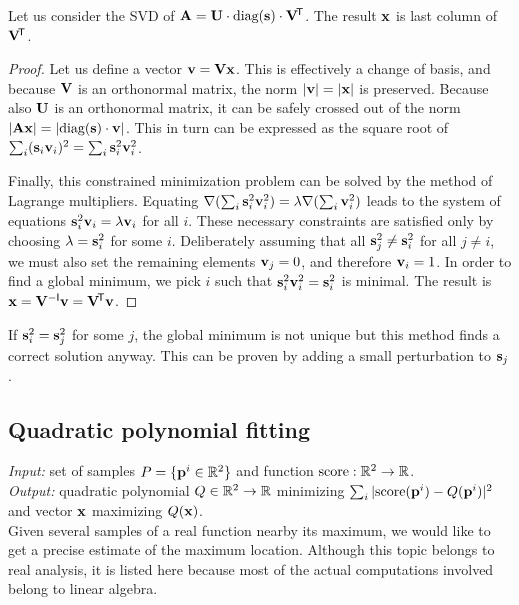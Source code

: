 Let us consider the SVD of $\mathbf{A} = \mathbf{U} \cdot \textrm{diag}(\mathbf{s}) \cdot \mathbf{V}^{\!\mathsf{T}}$.
The result $\mathbf{x}$ is last column of $\mathbf{V} ^{\!\mathsf{T}}$.

\begin{proof}
Let us define a vector $\mathbf{v} = \mathbf{V} \mathbf{x}$.
This is effectively a change of basis, and because $\mathbf{V}$ is an orthonormal matrix, the norm $|\mathbf{v}| = |\mathbf{x}|$ is preserved.
Because also $\mathbf{U}$ is an orthonormal matrix, it can be safely crossed out of the norm $|\mathbf{A} \mathbf{x}| = |\textrm{diag}(\mathbf{s}) \cdot \mathbf{v}|$.
This in turn can be expressed as the square root of $\sum_i (\mathbf{s}_i \mathbf{v}_i)^2 = \sum_i \mathbf{s}_i^2 \mathbf{v}_i^2$.

Finally, this constrained minimization problem can be solved by the method of Lagrange multipliers.
Equating $\nabla(\sum_i \mathbf{s}_i^2 \mathbf{v}_i^2) = \lambda \nabla (\sum_i \mathbf{v}_i^2)$ leads to the system of equations $\mathbf{s}_i^2 \mathbf{v}_i = \lambda \mathbf{v}_i$ for all $i$.
These necessary constraints are satisfied only by choosing $\lambda = \mathbf{s}_i^2$ for some $i$.
Deliberately assuming that all $\mathbf{s}_j^2 \neq \mathbf{s}_i^2$ for all $j \neq i$, we must also set the remaining elements $\mathbf{v}_j = 0$, and therefore $\mathbf{v}_i = 1$.
In order to find a global minimum, we pick $i$ such that $\mathbf{s}_i^2 \mathbf{v}_i^2 = \mathbf{s}_i^2$ is minimal.
The result is $\mathbf{x} = \mathbf{V} ^{-\mathsf{I}} \mathbf{v} = \mathbf{V} ^{\!\mathsf{T}} \mathbf{v}$.
\end{proof}

If $\mathbf{s}_i^2 = \mathbf{s}_j^2$ for some $j$, the global minimum is not unique but this method finds a correct solution anyway.
This can be proven by adding a small perturbation to $\mathbf{s}_j$.

\subsection{Quadratic polynomial fitting}
\textit{Input:} set of samples $P = \{\mathbf{p}^i \in \mathbb{R}^2 \}$ and function $\textrm{score}: \mathbb{R}^2 \rightarrow \mathbb{R}$.\\
\textit{Output:} quadratic polynomial $Q \in \mathbb{R}^2 \rightarrow \mathbb{R}$ minimizing $\sum_i |\textrm{score}(\mathbf{p}^i) - Q(\mathbf{p}^i)|^2$ and vector $\mathbf{x}$ maximizing $Q(\mathbf{x})$.\\

Given several samples of a real function nearby its maximum, we would like to get a precise estimate of the maximum location.
Although this topic belongs to real analysis, it is listed here because most of the actual computations involved belong to linear algebra.

